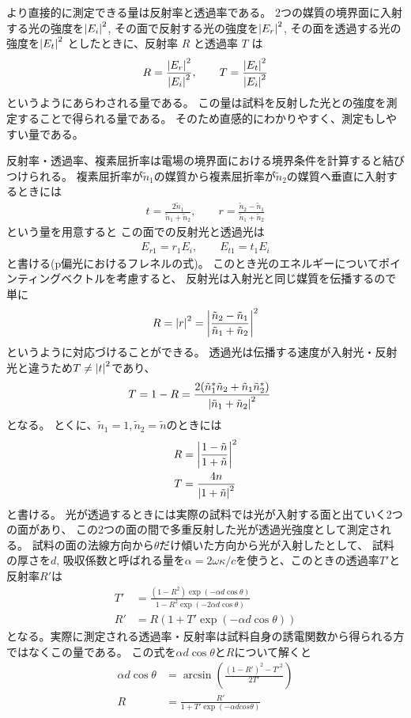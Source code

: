 \documentclass[11pt,dvipdfmx,a4paper]{jsarticle}
\begin{document}
より直接的に測定できる量は反射率と透過率である。
2つの媒質の境界面に入射する光の強度を\(\abs{E_i}^2\),
その面で反射する光の強度を\(\abs{E_r}^2\),
その面を透過する光の強度を\(\abs{E_t}^2\)
としたときに、反射率 \(R\) と透過率 \(T\) は
\begin{align}
    R = \frac{\abs{E_r}^2}{\abs{E_i}^2},\qquad  T = \frac{\abs{E_t}^2}{\abs{E_i}^2}
\end{align}
というようにあらわされる量である。
この量は試料を反射した光との強度を測定することで得られる量である。
そのため直感的にわかりやすく、測定もしやすい量である。

反射率・透過率、複素屈折率は電場の境界面における境界条件を計算すると結びつけられる。
複素屈折率が\(\tilde{n}_1\)の媒質から複素屈折率が\(\tilde{n}_2\)の媒質へ垂直に入射するときには
\begin{align}
    t = \frac{2\tilde{n}_1}{\tilde{n}_1 + \tilde{n}_2},\qquad  r = \frac{\tilde{n}_2-\tilde{n}_1}{\tilde{n}_1+\tilde{n}_2}
\end{align}
という量を用意すると
この面での反射光と透過光は
\begin{align}
    E_{r1} = r_1 E_i, \qquad E_{t1} = t_1 E_i
\end{align}
と書ける(p偏光におけるフレネルの式)。
このとき光のエネルギーについてポインティングベクトルを考慮すると、
反射光は入射光と同じ媒質を伝播するので単に
\begin{align}
    R = \abs{r}^2 = \abs{\frac{\tilde{n}_2-\tilde{n}_1}{\tilde{n}_1+\tilde{n}_2}}^2
\end{align}
というように対応づけることができる。
透過光は伝播する速度が入射光・反射光と違うため\(T\neq\abs{t}^2\)であり、
\begin{align}
    T &= 1 - R = \frac{2(\tilde{n}_1^*\tilde{n}_2+\tilde{n}_1\tilde{n}_2^*)}{\abs{\tilde{n}_1+\tilde{n}_2}^2}
\end{align}
となる。
とくに、\(\tilde{n}_1=1, \tilde{n}_2 = \tilde{n}\)のときには
\begin{align}
    R & = \abs{\frac{1-\tilde{n}}{1+\tilde{n}}}^2\\
    T & = \frac{4n}{\abs{1+\tilde{n}}^2}
\end{align}
と書ける。
光が透過するときには実際の試料では光が入射する面と出ていく2つの面があり、
この2つの面の間で多重反射した光が透過光強度として測定される。
試料の面の法線方向から\(\theta\)だけ傾いた方向から光が入射したとして、
試料の厚さを\(d\), 吸収係数と呼ばれる量を\(\alpha=2\omega\kappa/c\)を使うと、このときの透過率\(T'\)と反射率\(R'\)は
\begin{align}
    T' &= \frac{(1-R^2)\exp(-\alpha d\cos\theta)}{1-R^2\exp(-2\alpha d\cos\theta)}\\
    R' &= R(1+T'\exp(-\alpha d\cos\theta))
\end{align}
となる。実際に測定される透過率・反射率は試料自身の誘電関数から得られる方ではなくこの量である。
この式を\(\alpha d \cos\theta\)と\(R\)について解くと
\begin{align}
    \alpha d  \cos\theta&= \arcsin(\frac{(1-R')^2-T'^2}{2T'})\\
    R &= \frac{R'}{1+T'\exp(-\alpha d cos\theta)}
\end{align}
\end{document}

